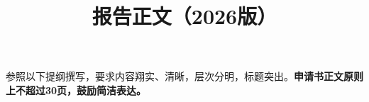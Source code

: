 \documentclass[12pt]{article}
\begin{document}

\setcounter{page}{1}
\title{报告正文（2026版）}

\maketitle
\thispagestyle{empty}

{\large 参照以下提纲撰写，要求内容翔实、清晰，层次分明，标题突出。{\bfseries\color{red}申请书正文原则上不超过30页，鼓励简洁表达。}
\textbf{}}








\end{document}
